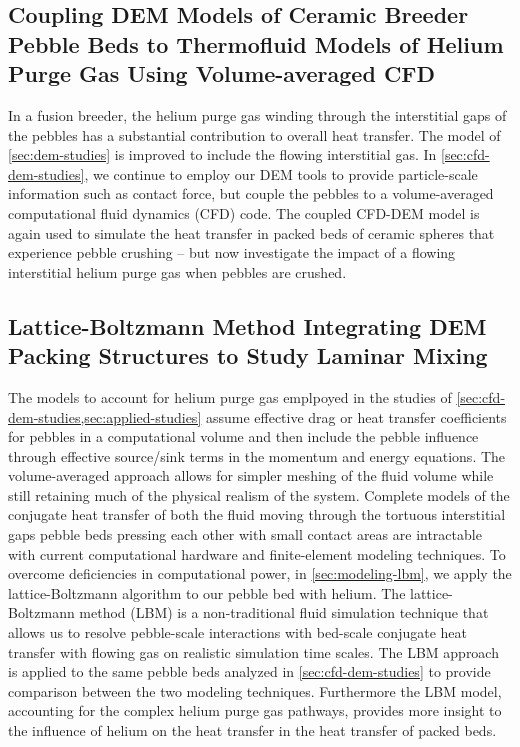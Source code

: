\subsection*{Coupling DEM Models of Ceramic Breeder Pebble Beds to Thermofluid Models of Helium Purge Gas Using Volume-averaged CFD}
In a fusion breeder, the helium purge gas winding through the interstitial gaps of the pebbles has a substantial contribution to overall heat transfer.\cite{Reimann:2002mi,Abou-Sena2005} The model of \cref{sec:dem-studies} is improved to include the flowing interstitial gas. In \cref{sec:cfd-dem-studies}, we continue to employ our DEM tools to provide particle-scale information such as contact force, but couple the pebbles to a volume-averaged computational fluid dynamics (CFD) code. The coupled CFD-DEM model is again used to simulate the heat transfer in packed beds of ceramic spheres that experience pebble crushing -- but now investigate the impact of a flowing interstitial helium purge gas when pebbles are crushed.


\subsection*{Lattice-Boltzmann Method Integrating DEM Packing Structures to Study Laminar Mixing}
The models to account for helium purge gas emplpoyed in the studies of \cref{sec:cfd-dem-studies,sec:applied-studies} assume effective drag or heat transfer coefficients for pebbles in a computational volume and then include the pebble influence through effective source/sink terms in the momentum and energy equations. The volume-averaged approach allows for simpler meshing of the fluid volume while still retaining much of the physical realism of the system. Complete models of the conjugate heat transfer of both the fluid moving through the tortuous interstitial gaps pebble beds pressing each other with small contact areas are intractable with current computational hardware and finite-element modeling techniques. To overcome deficiencies in computational power, in \cref{sec:modeling-lbm}, we apply the lattice-Boltzmann algorithm to our pebble bed with helium. The lattice-Boltzmann method (LBM) is a non-traditional fluid simulation technique that allows us to resolve pebble-scale interactions with bed-scale conjugate heat transfer with flowing gas on realistic simulation time scales. The LBM approach is applied to the same pebble beds analyzed in \cref{sec:cfd-dem-studies} to provide comparison between the two modeling techniques. Furthermore the LBM model, accounting for the complex helium purge gas pathways, provides more insight to the influence of helium on the heat transfer in the heat transfer of packed beds.


